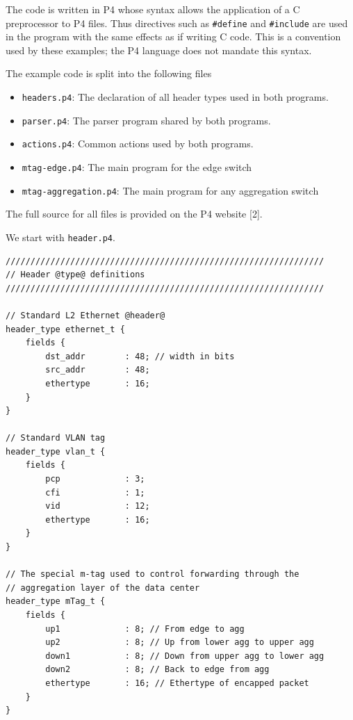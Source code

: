 \documentclass[12pt]{article}
\begin{document}
\begin{itemize}
The code is written in P4 whose syntax allows the application of a C preprocessor 
to P4 files. Thus directives such as \texttt{\#define} and \texttt{\#include} are used in 
the program with the same effects as if writing C code. This is a convention 
used by these examples; the P4 language does not mandate this syntax.

The example code is split into the following files

\begin{itemize}
\item
\texttt{headers.p4}: The declaration of all header types used in both programs.
\item
\texttt{parser.p4}: The parser program shared by both programs.
\item
\texttt{actions.p4}: Common actions used by both programs.
\item
\texttt{mtag-edge.p4}: The main program for the edge switch
\item
\texttt{mtag-aggregation.p4}: The main program for any aggregation switch
\end{itemize}

The full source for all files is provided on the P4 website [2].

We start with \texttt{header.p4}. 


\begin{lstlisting}[keywords={},frame=single,escapechar=\@]
////////////////////////////////////////////////////////////////
// Header @type@ definitions
////////////////////////////////////////////////////////////////

// Standard L2 Ethernet @header@
header_type ethernet_t {
    fields {
        dst_addr        : 48; // width in bits
        src_addr        : 48;
        ethertype       : 16;
    }
}

// Standard VLAN tag
header_type vlan_t {
    fields {
        pcp             : 3;
        cfi             : 1;
        vid             : 12;
        ethertype       : 16;
    }
}

// The special m-tag used to control forwarding through the
// aggregation layer of the data center
header_type mTag_t {
    fields {
        up1             : 8; // From edge to agg
        up2             : 8; // Up from lower agg to upper agg
        down1           : 8; // Down from upper agg to lower agg
        down2           : 8; // Back to edge from agg
        ethertype       : 16; // Ethertype of encapped packet
    }
}


\end{lstlisting}
\end{itemize}
\end{document}
